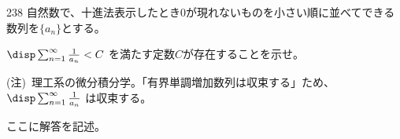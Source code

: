 \begin{prob}{238}{}{}
 自然数で、十進法表示したとき0が現れないものを小さい順に並べてできる数列を$\{a_n\}$とする。

 $\disp \sum_{n=1}^\infty \frac{1}{a_n} < C$ を満たす定数$C$が存在することを示せ。

 {\tiny (注)~理工系の微分積分学。「有界単調増加数列は収束する」ため、$\disp \sum_{n=1}^\infty \frac{1}{a_n}$ は収束する。}
\end{prob}

ここに解答を記述。